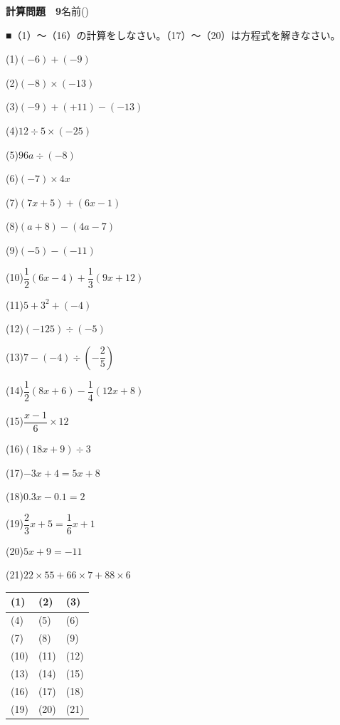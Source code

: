 \documentclass[a4paper,11pt]{ltjsarticle}
\newlength{\qcol}\setlength{\qcol}{0.47\textwidth}
\newlength{\qgap}
\newlength{\anscolw}\setlength{\anscolw}{0.30\textwidth}
\newlength{\ansh}
\newcommand{\Q}[2]{\parbox[t]{\qcol}{\raggedright (#1)\hspace{0.6em}$\displaystyle #2$}}
\newcommand{\QR}[4]{\Q{#1}{#2}\hfill\Q{#3}{#4}\par\vspace{\qgap}}
\newcommand{\anscell}[1]{\rule[-\ansdrop]{0pt}{\ansh}(#1)}
\newlength{\ansdrop}
\begin{document}
{\large\bfseries 計算問題　9}\hfill 名前(\underline{\hspace{32mm}})\par\vspace{3mm}
■（1）〜（16）の計算をしなさい。（17）〜（20）は方程式を解きなさい。\par\vspace{3mm}
\setlength{\qgap}{5.4mm}
\QR{1}{(-6)+(-9)}{2}{(-8)\times(-13)}
\QR{3}{(-9)+(+11)-(-13)}{4}{12\div5\times(-25)}
\QR{5}{96a\div(-8)}{6}{(-7)\times4x}
\QR{7}{(7x+5)+(6x-1)}{8}{(a+8)-(4a-7)}
\QR{9}{(-5)-(-11)}{10}{\dfrac{1}{2}(6x-4)+\dfrac{1}{3}(9x+12)}
\QR{11}{5+3^2+(-4)}{12}{(-125)\div(-5)}
\QR{13}{7-(-4)\div\left(-\dfrac{2}{5}\right)}{14}{\dfrac{1}{2}(8x+6)-\dfrac{1}{4}(12x+8)}
\QR{15}{\dfrac{x-1}{6}\times12}{16}{(18x+9)\div3}
\QR{17}{-3x+4=5x+8}{18}{0.3x-0.1=2}
\QR{19}{\dfrac{2}{3}x+5=\dfrac{1}{6}x+1}{20}{5x+9=-11}
\vspace{1mm}
\Q{21}{22\times55+66\times7+88\times6}\par\vspace{3mm}
\setlength{\ansh}{9.5mm}\setlength{\ansdrop}{6mm}%
\begin{center}\begin{tabular}{|p{\anscolw}|p{\anscolw}|p{\anscolw}|}\hline
\anscell{1} & \anscell{2} & \anscell{3} \\\hline
\anscell{4} & \anscell{5} & \anscell{6} \\\hline
\anscell{7} & \anscell{8} & \anscell{9} \\\hline
\anscell{10} & \anscell{11} & \anscell{12} \\\hline
\anscell{13} & \anscell{14} & \anscell{15} \\\hline
\anscell{16} & \anscell{17} & \anscell{18} \\\hline
\anscell{19} & \anscell{20} & \anscell{21} \\\hline
\end{tabular}\end{center}
\end{document}
